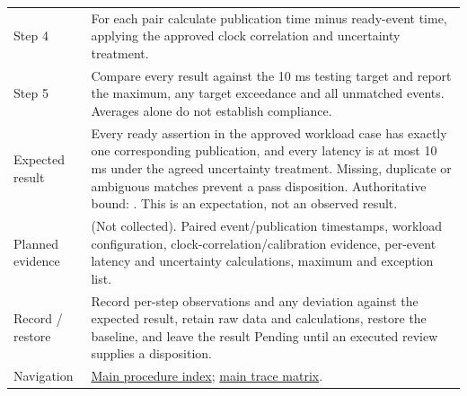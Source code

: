\begin{tabularx}{\linewidth}{L{3.2cm}Y}
Step 4 & For each pair calculate publication time minus ready-event time, applying the approved clock correlation and uncertainty treatment.\\
Step 5 & Compare every result against the 10 ms testing target and report the maximum, any target exceedance and all unmatched events. Averages alone do not establish compliance.\\
Expected result & Every ready assertion in the approved workload case has exactly one corresponding publication, and every latency is at most 10 ms under the agreed uncertainty treatment. Missing, duplicate or ambiguous matches prevent a pass disposition. Authoritative bound: . This is an expectation, not an observed result.\\
Planned evidence &  (Not collected). Paired event/publication timestamps, workload configuration, clock-correlation/calibration evidence, per-event latency and uncertainty calculations, maximum and exception list.\\
Record / restore & Record per-step observations and any deviation against the expected result, retain raw data and calculations, restore the baseline, and leave the result Pending until an executed review supplies a disposition.\\
Navigation & \hyperref[Table:WeekTwoTests]{Main procedure index}; \hyperref[Table:TraceabilityMatrix]{main trace matrix}.\\
\end{tabularx}
\normalsize
